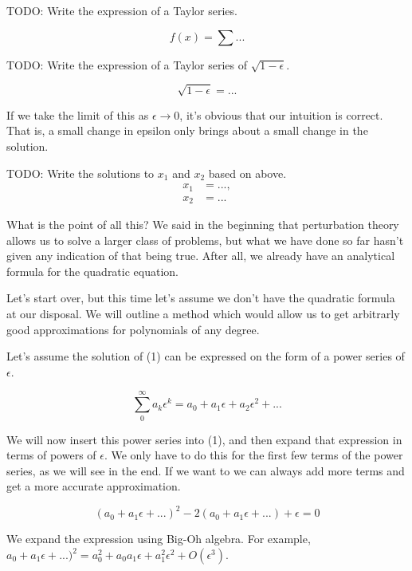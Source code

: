 \documentclass[12pt]{article}
\begin{document}
TODO: Write the expression of a Taylor series.

\begin{equation}
f(x) = \sum ...
\end{equation}

TODO: Write the expression of a Taylor series of $\sqrt{1 - \epsilon}$.

\begin{equation}
\sqrt{1 - \epsilon} = ...
\end{equation}

If we take the limit of this as $\epsilon \to 0$, it's obvious that our
intuition is correct. That is, a small change in epsilon only brings about a
small change in the solution.

TODO: Write the solutions to $x_1$ and $x_2$ based on above.
\begin{align*}
x_1 &= ..., \\
x_2 &= ...
\end{align*}

What is the point of all this? We said in the beginning that perturbation theory
allows us to solve a larger class of problems, but what we have done so far
hasn't given any indication of that being true. After all, we already have an
analytical formula for the quadratic equation.

Let's start over, but this time let's assume we don't have the quadratic formula
at our disposal. We will outline a method which would allow us to get arbitrarly
good approximations for polynomials of any degree.

Let's assume the solution of (1) can be expressed on the form of a power series
of $\epsilon$.

\begin{equation}
\sum_0^{\infty} a_k \epsilon^k = a_0 + a_1 \epsilon + a_2 \epsilon^2 + ...
\end{equation}

We will now insert this power series into (1), and then expand that expression
in terms of powers of $\epsilon$. We only have to do this for the first few
terms of the power series, as we will see in the end. If we want to we can
always add more terms and get a more accurate approximation.

\begin{equation}
(a_0 + a_1 \epsilon + ...)^2 - 2(a_0 + a_1 \epsilon + ...) + \epsilon = 0
\end{equation}

We expand the expression using Big-Oh algebra. For example, $a_0 + a_1 \epsilon
+ ...)^2 = a_0^2 + a_0 a_1 \epsilon + a_1^2 \epsilon^2 + O(\epsilon^3)$.
\end{document}
